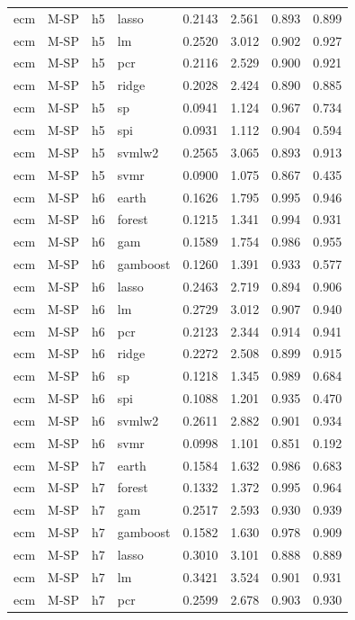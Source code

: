 \begin{ThreePartTable}
\begin{longtable}[t]{llclcccc}
ecm & M-SP & h5 & lasso & 0.2143 & 2.561 & 0.893 & 0.899\\
ecm & M-SP & h5 & lm & 0.2520 & 3.012 & 0.902 & 0.927\\
ecm & M-SP & h5 & pcr & 0.2116 & 2.529 & 0.900 & 0.921\\
ecm & M-SP & h5 & ridge & 0.2028 & 2.424 & 0.890 & 0.885\\
ecm & M-SP & h5 & sp & 0.0941 & 1.124 & 0.967 & 0.734\\
ecm & M-SP & h5 & spi & 0.0931 & 1.112 & 0.904 & 0.594\\
ecm & M-SP & h5 & svmlw2 & 0.2565 & 3.065 & 0.893 & 0.913\\
ecm & M-SP & h5 & svmr & 0.0900 & 1.075 & 0.867 & 0.435\\
\addlinespace
ecm & M-SP & h6 & earth & 0.1626 & 1.795 & 0.995 & 0.946\\
ecm & M-SP & h6 & forest & 0.1215 & 1.341 & 0.994 & 0.931\\
ecm & M-SP & h6 & gam & 0.1589 & 1.754 & 0.986 & 0.955\\
ecm & M-SP & h6 & gamboost & 0.1260 & 1.391 & 0.933 & 0.577\\
ecm & M-SP & h6 & lasso & 0.2463 & 2.719 & 0.894 & 0.906\\
ecm & M-SP & h6 & lm & 0.2729 & 3.012 & 0.907 & 0.940\\
ecm & M-SP & h6 & pcr & 0.2123 & 2.344 & 0.914 & 0.941\\
ecm & M-SP & h6 & ridge & 0.2272 & 2.508 & 0.899 & 0.915\\
ecm & M-SP & h6 & sp & 0.1218 & 1.345 & 0.989 & 0.684\\
ecm & M-SP & h6 & spi & 0.1088 & 1.201 & 0.935 & 0.470\\
ecm & M-SP & h6 & svmlw2 & 0.2611 & 2.882 & 0.901 & 0.934\\
ecm & M-SP & h6 & svmr & 0.0998 & 1.101 & 0.851 & 0.192\\
\addlinespace
ecm & M-SP & h7 & earth & 0.1584 & 1.632 & 0.986 & 0.683\\
ecm & M-SP & h7 & forest & 0.1332 & 1.372 & 0.995 & 0.964\\
ecm & M-SP & h7 & gam & 0.2517 & 2.593 & 0.930 & 0.939\\
ecm & M-SP & h7 & gamboost & 0.1582 & 1.630 & 0.978 & 0.909\\
ecm & M-SP & h7 & lasso & 0.3010 & 3.101 & 0.888 & 0.889\\
ecm & M-SP & h7 & lm & 0.3421 & 3.524 & 0.901 & 0.931\\
ecm & M-SP & h7 & pcr & 0.2599 & 2.678 & 0.903 & 0.930\\

\end{longtable}
\end{ThreePartTable}
